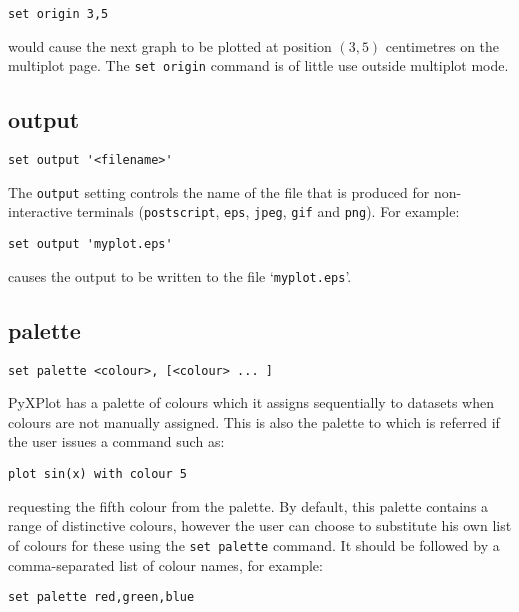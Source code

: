 \documentclass[a4paper,onecolumn,11pt]{book}
\begin{document}
\begin{verbatim}
set origin 3,5
\end{verbatim}

\noindent would cause the next graph to be plotted at position $(3,5)$ centimetres on the
multiplot page. The {\tt set origin} command is of little use outside multiplot
mode.


\subsection{output}

\begin{verbatim}
set output '<filename>'
\end{verbatim}

The {\tt output} setting controls the name of the file that is produced for
non-interactive terminals ({\tt postscript}, {\tt eps}, {\tt jpeg}, {\tt gif}
and {\tt png}).  For example:

\begin{verbatim}
set output 'myplot.eps'
\end{verbatim}

\noindent causes the output to be written to the file `{\tt myplot.eps}'.


\subsection{palette}

\begin{verbatim}
set palette <colour>, [<colour> ... ]
\end{verbatim}

PyXPlot has a palette of colours which it assigns sequentially to datasets when
colours are not manually assigned. This is also the palette to which is
referred if the user issues a command such as:

\begin{verbatim}
plot sin(x) with colour 5
\end{verbatim}

\noindent requesting the fifth colour from the palette. By default, this palette contains
a range of distinctive colours, however the user can choose to substitute his
own list of colours for these using the {\tt set palette} command. It should be
followed by a comma-separated list of colour names, for example:

\begin{verbatim}
set palette red,green,blue
\end{verbatim}
\end{document}
